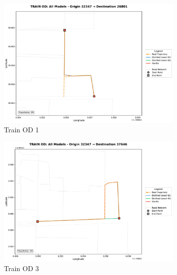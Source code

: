 \begin{figure}[H]
    \centering
    \begin{subfigure}{0.49\linewidth}
        \centering
        \includegraphics[width=\linewidth]{assets/plots/eval/beijing/cross_model/train_od_comparison_1_origin32347_dest26801.pdf}
        \caption{Train OD 1}
    \end{subfigure}
    \begin{subfigure}{0.49\linewidth}
        \centering
        \includegraphics[width=\linewidth]{assets/plots/eval/beijing/cross_model/train_od_comparison_3_origin32347_dest37646.pdf}
        \caption{Train OD 3}
    \end{subfigure}
    \begin{subfigure}{0.49\linewidth}
        \centering

\end{subfigure}
\end{figure}
